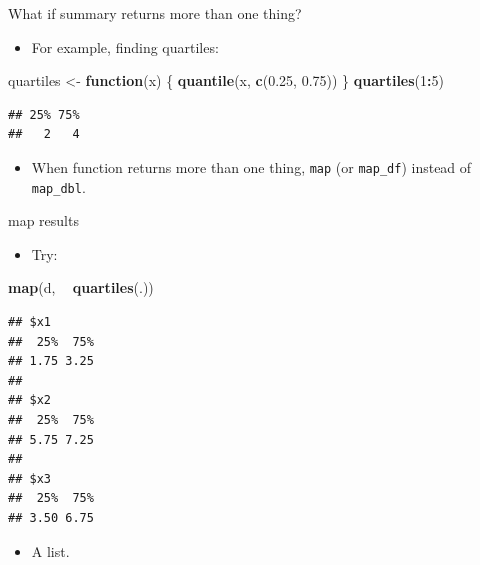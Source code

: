 \documentclass[
  ignorenonframetext,
]{beamer}
\newenvironment{Shaded}{\begin{snugshade}}{\end{snugshade}}
\newcommand{\ControlFlowTok}[1]{\textcolor[rgb]{0.13,0.29,0.53}{\textbf{#1}}}
\newcommand{\DecValTok}[1]{\textcolor[rgb]{0.00,0.00,0.81}{#1}}
\newcommand{\FloatTok}[1]{\textcolor[rgb]{0.00,0.00,0.81}{#1}}
\newcommand{\KeywordTok}[1]{\textcolor[rgb]{0.13,0.29,0.53}{\textbf{#1}}}
\newcommand{\NormalTok}[1]{#1}
\newcommand{\OperatorTok}[1]{\textcolor[rgb]{0.81,0.36,0.00}{\textbf{#1}}}
\newcommand{\StringTok}[1]{\textcolor[rgb]{0.31,0.60,0.02}{#1}}
\providecommand{\tightlist}{%
  \setlength{\itemsep}{0pt}\setlength{\parskip}{0pt}}
\begin{document}
\begin{frame}[fragile]{What if summary returns more than one thing?}
\protect\hypertarget{what-if-summary-returns-more-than-one-thing}{}

\begin{itemize}
\tightlist
\item
  For example, finding quartiles:
\end{itemize}

\begin{Shaded}
\begin{Highlighting}[]
\NormalTok{quartiles <-}\StringTok{ }\ControlFlowTok{function}\NormalTok{(x) \{}
  \KeywordTok{quantile}\NormalTok{(x, }\KeywordTok{c}\NormalTok{(}\FloatTok{0.25}\NormalTok{, }\FloatTok{0.75}\NormalTok{))}
\NormalTok{\}}
\KeywordTok{quartiles}\NormalTok{(}\DecValTok{1}\OperatorTok{:}\DecValTok{5}\NormalTok{)}
\end{Highlighting}
\end{Shaded}

\begin{verbatim}
## 25% 75% 
##   2   4
\end{verbatim}

\begin{itemize}
\tightlist
\item
  When function returns more than one thing, \texttt{map} (or
  \texttt{map\_df}) instead of \texttt{map\_dbl}.
\end{itemize}

\end{frame}

\begin{frame}[fragile]{map results}
\protect\hypertarget{map-results}{}

\begin{itemize}
\tightlist
\item
  Try:
\end{itemize}

\begin{Shaded}
\begin{Highlighting}[]
\KeywordTok{map}\NormalTok{(d, }\OperatorTok{~}\StringTok{ }\KeywordTok{quartiles}\NormalTok{(.))}
\end{Highlighting}
\end{Shaded}

\begin{verbatim}
## $x1
##  25%  75% 
## 1.75 3.25 
## 
## $x2
##  25%  75% 
## 5.75 7.25 
## 
## $x3
##  25%  75% 
## 3.50 6.75
\end{verbatim}

\begin{itemize}
\tightlist
\item
  A list.
\end{itemize}

\end{frame}
\end{document}
